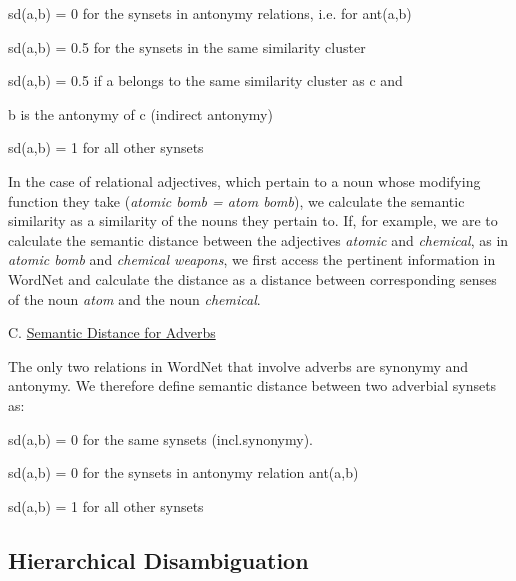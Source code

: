 \hspace*{1cm}
    sd(a,b) = 0 for the synsets in antonymy relations, i.e. for ant(a,b)

\hspace*{1cm}
    sd(a,b) = 0.5 for the synsets in the same similarity cluster

\hspace*{1cm}
    sd(a,b) = 0.5 if a belongs to the same similarity cluster as c and 

\hspace*{3.5cm}
                     b is the antonymy of c (indirect antonymy)

\hspace*{1cm}
    sd(a,b) = 1 for all other synsets


In the case of relational adjectives, which pertain to a noun whose modifying function they take ({\it atomic bomb = atom bomb}), we calculate the semantic similarity as a similarity of the nouns they pertain to. If, for example, we are to calculate the semantic distance between the adjectives {\it atomic} and {\it chemical}, as in {\it atomic bomb} and {\it chemical weapons}, we first access the pertinent information in WordNet and calculate the distance as a distance between corresponding senses of the noun {\it atom} and the noun {\it chemical}.

C. \underline{Semantic Distance for Adverbs}

The only two relations in WordNet that involve adverbs are synonymy and antonymy. We therefore define semantic distance between two adverbial synsets as:

\hspace*{2cm}
sd(a,b) = 0 for the same synsets (incl.synonymy).

\hspace*{2cm}
sd(a,b) = 0 for the synsets in antonymy relation ant(a,b)

\hspace*{2cm}
sd(a,b) = 1 for all other synsets

\subsection{Hierarchical Disambiguation}

